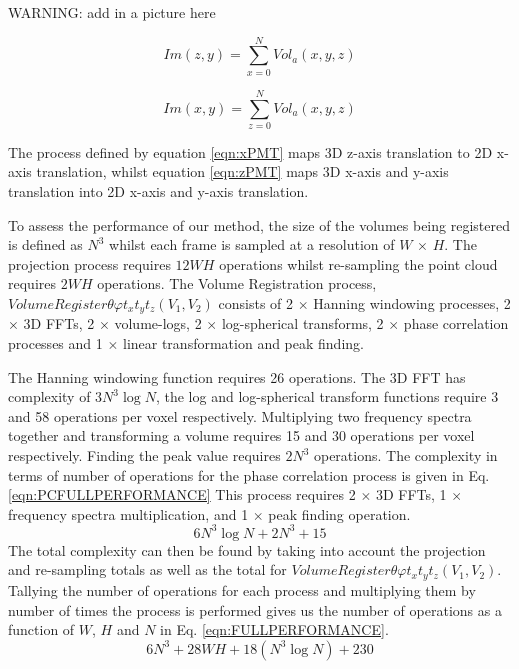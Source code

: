 WARNING: add in a picture here

\begin{equation} \label{eqn:xPMT}
Im(z,y) = \sum_{x=0}^{N}{Vol_a(x,y,z)}
\end{equation}

\begin{equation} \label{eqn:zPMT}
Im(x,y) = \sum_{z=0}^{N}{Vol_a(x,y,z)}
\end{equation}

The process defined by equation \ref{eqn:xPMT} maps 3D z-axis translation to 2D x-axis translation, whilst equation \ref{eqn:zPMT} maps 3D x-axis and y-axis translation into 2D x-axis and y-axis translation.


To assess the performance of our method, the size of the volumes being registered is defined as $N^3$ whilst each frame is sampled at a resolution of $W$ $\times$ $H$. The projection process requires $12WH$ operations whilst re-sampling the point cloud requires $2WH$ operations. The Volume Registration process, $VolumeRegister{\theta \varphi t_x t_y t_z}(V_1, V_2)$ consists of 2 $\times$ Hanning windowing processes, 2 $\times$ 3D FFTs, 2 $\times$ volume-logs, 2 $\times$ log-spherical transforms, 2 $\times$ phase correlation processes and 1 $\times$ linear transformation and peak finding. 

The Hanning windowing function requires 26 operations. The 3D FFT has complexity of $3N^3\log{N}$, the log and log-spherical transform functions require 3 and 58 operations per voxel respectively. Multiplying two frequency spectra together and transforming a volume requires 15 and 30 operations per voxel respectively. Finding the peak value requires $2N^3$ operations. The complexity in terms of number of operations for the phase correlation process is given in Eq. \ref{eqn:PCFULLPERFORMANCE} This process requires 2 $\times$ 3D FFTs, 1 $\times$ frequency spectra multiplication, and 1 $\times$ peak finding operation. 
\begin{equation} \label{eqn:PCFULLPERFORMANCE}
6N^3\log{N} + 2N^3 + 15
\end{equation}
The total complexity can then be found by taking into account the projection and re-sampling totals as well as the total for $VolumeRegister{\theta \varphi t_x t_y t_z}(V_1, V_2)$. Tallying the number of operations for each process and multiplying them by number of times the process is performed gives us the number of operations as a function of $W$, $H$ and $N$ in Eq. \ref{eqn:FULLPERFORMANCE}.
\begin{equation} \label{eqn:FULLPERFORMANCE}
6N^3 + 28WH + 18(N^3\log{N}) + 230
\end{equation}

